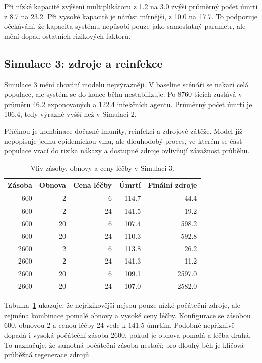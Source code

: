 \documentclass{article}
\begin{document}
Při nízké kapacitě zvýšení multiplikátoru z 1.2 na 3.0 zvýší průměrný počet
úmrtí z 8.7 na 23.2. Při vysoké kapacitě je nárůst mírnější, z 10.0 na 17.7.
To podporuje očekávání, že kapacita systému nepůsobí pouze jako samostatný
parametr, ale mění dopad ostatních rizikových faktorů.

\subsection{Simulace 3: zdroje a reinfekce}

Simulace 3 mění chování modelu nejvýrazněji. V baseline scénáři se nakazí celá
populace, ale systém se do konce běhu nestabilizuje. Po 8760 ticích zůstává
v průměru 46.2 exponovaných a 122.4 infekčních agentů. Průměrný počet úmrtí je
106.4, tedy výrazně vyšší než v Simulaci 2.

Příčinou je kombinace dočasné imunity, reinfekcí a zdrojové zátěže. Model již
nepopisuje jednu epidemickou vlnu, ale dlouhodobý proces, ve kterém se část
populace vrací do rizika nákazy a dostupné zdroje ovlivňují závažnost průběhu.

\begin{table}[htbp]
\centering
\small
\begin{tabular}{r r r r r}
\hline
\textbf{Zásoba} & \textbf{Obnova} & \textbf{Cena léčby} & \textbf{Úmrtí} & \textbf{Finální zdroje} \\
\hline
600 & 2 & 6 & 114.7 & 44.4 \\
600 & 2 & 24 & 141.5 & 19.2 \\
600 & 20 & 6 & 107.4 & 598.2 \\
600 & 20 & 24 & 110.3 & 592.8 \\
2600 & 2 & 6 & 113.8 & 26.2 \\
2600 & 2 & 24 & 141.3 & 11.2 \\
2600 & 20 & 6 & 109.1 & 2597.0 \\
2600 & 20 & 24 & 107.0 & 2582.0 \\
\hline
\end{tabular}
\caption{Vliv zásoby, obnovy a ceny léčby v Simulaci 3.}
\label{tab:s3_resources}
\end{table}

Tabulka~\ref{tab:s3_resources} ukazuje, že nejrizikovější nejsou pouze nízké
počáteční zdroje, ale zejména kombinace pomalé obnovy a vysoké ceny léčby.
Konfigurace se zásobou 600, obnovou 2 a cenou léčby 24 vede k 141.5 úmrtím.
Podobně nepříznivě dopadá i vysoká počáteční zásoba 2600, pokud je obnova pomalá
a léčba drahá. To naznačuje, že samotná počáteční zásoba nestačí; pro dlouhý
běh je klíčová průběžná regenerace zdrojů.
\end{document}
